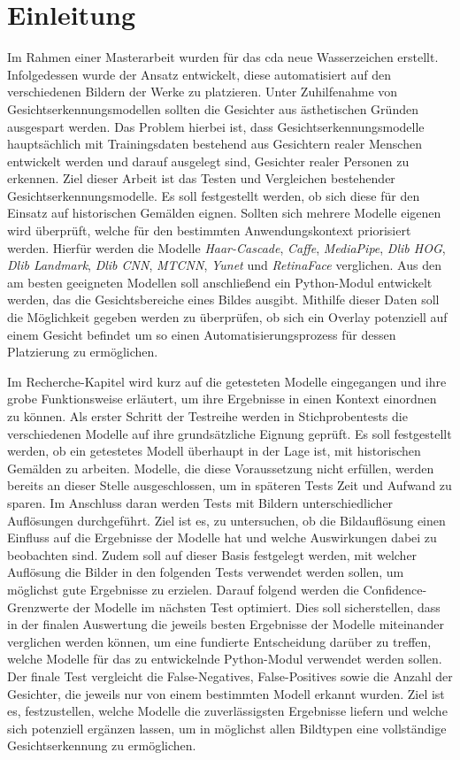 \chapter{Einleitung}
%
Im Rahmen einer Masterarbeit wurden für das \gls{cda} neue Wasserzeichen erstellt. Infolgedessen wurde der Ansatz entwickelt, diese automatisiert auf den verschiedenen Bildern der Werke zu platzieren. Unter Zuhilfenahme von Gesichtserkennungsmodellen sollten die Gesichter aus ästhetischen Gründen ausgespart werden. Das Problem hierbei ist, dass Gesichtserkennungsmodelle hauptsächlich mit Trainingsdaten bestehend aus Gesichtern realer Menschen entwickelt werden und darauf ausgelegt sind, Gesichter realer Personen zu erkennen. Ziel dieser Arbeit ist das Testen und Vergleichen bestehender Gesichtserkennungsmodelle. Es soll festgestellt werden, ob sich diese für den Einsatz auf historischen Gemälden eignen. Sollten sich mehrere Modelle eigenen wird überprüft, welche für den bestimmten Anwendungskontext priorisiert werden. Hierfür werden die Modelle \textit{Haar-Cascade}, \textit{Caffe}, \textit{MediaPipe}, \textit{Dlib HOG}, \textit{Dlib Landmark}, \textit{Dlib CNN}, \textit{MTCNN}, \textit{Yunet} und \textit{RetinaFace} verglichen. Aus den am besten geeigneten Modellen soll anschließend ein Python-Modul entwickelt werden, das die Gesichtsbereiche eines Bildes ausgibt. Mithilfe dieser Daten soll die Möglichkeit gegeben werden zu überprüfen, ob sich ein Overlay potenziell auf einem Gesicht befindet um so einen Automatisierungsprozess für dessen Platzierung zu ermöglichen.

Im Recherche-Kapitel wird kurz auf die getesteten Modelle eingegangen und ihre grobe Funktionsweise erläutert, um ihre Ergebnisse in einen Kontext einordnen zu können.
Als erster Schritt der Testreihe werden in Stichprobentests die verschiedenen Modelle auf ihre grundsätzliche Eignung geprüft. Es soll festgestellt werden, ob ein getestetes Modell überhaupt in der Lage ist, mit historischen Gemälden zu arbeiten. Modelle, die diese Voraussetzung nicht erfüllen, werden bereits an dieser Stelle ausgeschlossen, um in späteren Tests Zeit und Aufwand zu sparen.
Im Anschluss daran werden Tests mit Bildern unterschiedlicher Auflösungen durchgeführt. Ziel ist es, zu untersuchen, ob die Bildauflösung einen Einfluss auf die Ergebnisse der Modelle hat und welche Auswirkungen dabei zu beobachten sind. Zudem soll auf dieser Basis festgelegt werden, mit welcher Auflösung die Bilder in den folgenden Tests verwendet werden sollen, um möglichst gute Ergebnisse zu erzielen.
Darauf folgend werden die Confidence-Grenzwerte der Modelle im nächsten Test optimiert. Dies soll sicherstellen, dass in der finalen Auswertung die jeweils besten Ergebnisse der Modelle miteinander verglichen werden können, um eine fundierte Entscheidung darüber zu treffen, welche Modelle für das zu entwickelnde Python-Modul verwendet werden sollen.
Der finale Test vergleicht die False-Negatives, False-Positives sowie die Anzahl der Gesichter, die jeweils nur von einem bestimmten Modell erkannt wurden. Ziel ist es, festzustellen, welche Modelle die zuverlässigsten Ergebnisse liefern und welche sich potenziell ergänzen lassen, um in möglichst allen Bildtypen eine vollständige Gesichtserkennung zu ermöglichen.
